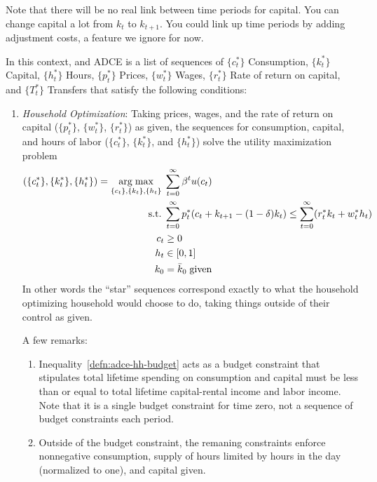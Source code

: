 \documentclass[12pt]{article}
\theoremstyle{plain}
\theoremstyle{definition}
\theoremstyle{remark}
\DeclareMathOperator*{\argmax}{arg\;max}
\newcommand{\sumtinfz}{\sum^\infty_{t=0}}
\begin{document}
Note that there will be no real link between time periods for capital.
You can change capital a lot from $k_t$ to $k_{t+1}$. You could link up
time periods by adding adjustment costs, a feature we ignore for now.

In this context, and ADCE is a list of sequences of
$\{c_t^*\}$  Consumption,
$\{k_t^*\}$  Capital,
$\{h_t^*\}$  Hours,
$\{p_t^*\}$  Prices,
$\{w_t^*\}$  Wages,
$\{r_t^*\}$  Rate of return on capital, and
$\{T_t^*\}$ Transfers
that satisfy the following conditions:

\begin{enumerate}
  \item \emph{Household Optimization}: Taking prices,
    wages, and the rate of return on capital
    ($\{p^*_t\}$, $\{w^*_t\}$, $\{r^*_t\}$) as given, the
    sequences for consumption, capital, and hours of labor
    ($\{c_t^*\}$, $\{k_t^*\}$, and $\{h_t^*\}$)
    solve the utility maximization problem
    \begin{align}
      (\{c_t^*\}, \{k_t^*\}, \{h_t^*\})
      =
      \argmax_{\{c_t\}, \{k_t\}, \{h_t\}}
        \; &\sumtinfz \beta^t u(c_t)
        \label{defn:adce-hh-objfcn}\\
      \text{s.t.} \; &
        \sumtinfz p^*_t(c_t + k_{t+1}-(1-\delta)k_t) \leq
        \sumtinfz (r^*_t k_t + w^*_t h_t)
        \label{defn:adce-hh-budget}\\
      c_t &\geq 0 \notag\\
      h_t &\in [0,1] \notag\\
      k_0 &= \bar{k}_0 \; \text{given} \notag
    \end{align}
    In other words the ``star'' sequences correspond exactly to what the
    household optimizing household would choose to do, taking things
    outside of their control as given.

    A few remarks:
    \begin{enumerate}
      \item Inequality~\ref{defn:adce-hh-budget} acts as a budget
        constraint that stipulates total lifetime spending on
        consumption and capital must be less than or equal to total
        lifetime capital-rental income and labor income. Note that it is
        a single budget constraint for time zero, not a sequence of
        budget constraints each period.

      \item Outside of the budget constraint, the remaning constraints
        enforce nonnegative consumption, supply of hours limited by
        hours in the day (normalized to one), and capital given.


\end{enumerate}
\end{enumerate}
\end{document}
